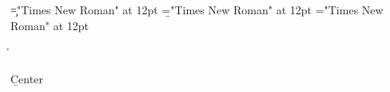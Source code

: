 \font\c="Times New Roman" at 12pt
\font\b="Times New Roman" at 12pt
\font\a="Times New Roman" at 12pt
 \r\n
{}
\centerline{\b Center
}

\bye
